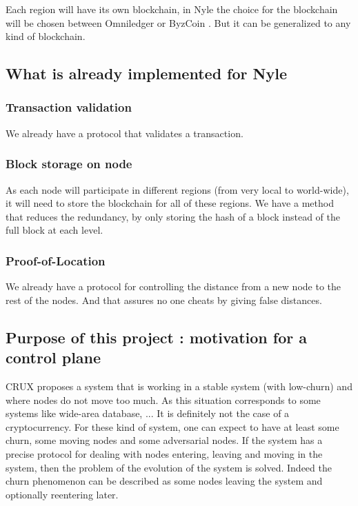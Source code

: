 \documentclass[a4paper,11pt,oneside]{report}
\begin{document}
Each region will have its own blockchain, in Nyle the choice for the blockchain
will be chosen between Omniledger \cite{Kokoris-Kogias2017} or ByzCoin
\cite{Kogias2016}. But it can be generalized to any kind of blockchain.

\subsection{What is already implemented for Nyle} \subsubsection{Transaction
validation} We already have a protocol that validates a transaction.

\subsubsection{Block storage on node} As each node will participate in
different regions (from very local to world-wide), it will need to store the
blockchain for all of these regions. We have a method that reduces the
redundancy, by only storing the hash of a block instead of the full block at
each level. 

\subsubsection{Proof-of-Location} We already have a protocol for controlling
the distance from a new node to the rest of the nodes. And that assures no one
cheats by giving false distances. 

\subsection{Purpose of this project : motivation for a control plane}

CRUX \cite{Basescu2014} proposes a system that is working in a stable system
(with low-churn) and where nodes do not move too much. As this situation
corresponds to some systems like wide-area database, ... It is definitely not
the case of a cryptocurrency.  For these kind of system, one can expect to have
at least some churn, some moving nodes and some adversarial nodes.  If the
system has a precise protocol for dealing with nodes entering, leaving and
moving in the system, then the problem of the evolution of the system is
solved. Indeed the churn phenomenon can be described as some nodes leaving the
system and optionally reentering later. 
\end{document}
